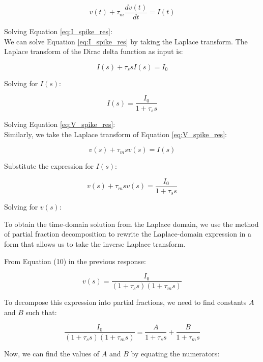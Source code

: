 \begin{equation} \label{eq:V_spike_res}
    v(t) + \tau_m \frac{dv(t)}{dt} = I(t)
\end{equation}

Solving Equation \ref{eq:I_spike_res}: \\
We can solve Equation \ref{eq:I_spike_res} by taking the Laplace transform. The Laplace transform of the Dirac delta function as input is:

\begin{equation}
    I(s) + \tau_s s I(s) = I_0
\end{equation}

Solving for $I(s)$:

\begin{equation}
    I(s) = \frac{I_0}{1 + \tau_s s}
\end{equation}

Solving Equation \ref{eq:V_spike_res}: \\
Similarly, we take the Laplace transform of Equation \ref{eq:V_spike_res}:

\begin{equation}
    v(s) + \tau_m s v(s) = I(s)
\end{equation}

Substitute the expression for $I(s)$:

\begin{equation}
    v(s) + \tau_m s v(s) = \frac{I_0}{1 + \tau_s s}
\end{equation}

Solving for $v(s)$:

To obtain the time-domain solution from the Laplace domain, we use the method of partial fraction decomposition to rewrite the Laplace-domain expression in a form that allows us to take the inverse Laplace transform.

From Equation (10) in the previous response:

\begin{equation}
    v(s) = \frac{I_0}{(1 + \tau_s s)(1 + \tau_m s)}
\end{equation}

To decompose this expression into partial fractions, we need to find constants $A$ and $B$ such that:

\begin{equation}
    \frac{I_0}{(1 + \tau_s s)(1 + \tau_m s)} = \frac{A}{1 + \tau_s s} + \frac{B}{1 + \tau_m s}
\end{equation}

Now, we can find the values of $A$ and $B$ by equating the numerators:

